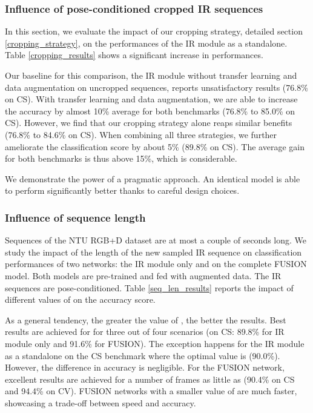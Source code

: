 \documentclass[letterpaper, 10 pt, conference]{ieeeconf}
\begin{document}
\subsubsection{Influence of pose-conditioned cropped IR sequences}

In this section, we evaluate the impact of our cropping strategy, detailed section \ref{cropping_strategy}, on the performances of the IR module as a standalone. Table \ref{cropping_results} shows a significant increase in performances. 

Our baseline for this comparison, the IR module without transfer learning and data augmentation on uncropped sequences, reports unsatisfactory results (76.8\% on CS). With transfer learning and data augmentation, we are able to increase the accuracy by almost 10\% average for both benchmarks (76.8\% to 85.0\% on CS). However, we find that our cropping strategy alone reaps similar benefits (76.8\% to 84.6\% on CS). When combining all three strategies, we further ameliorate the classification score by about 5\% (89.8\% on CS). The average gain for both benchmarks is thus above 15\%, which is considerable.

We demonstrate the power of a pragmatic approach. An identical model is able to perform significantly better thanks to careful design choices.

\subsubsection{Influence of sequence length}

Sequences of the NTU RGB+D dataset are at most a couple of seconds long. We study the impact of the length  of the new sampled IR sequence on classification performances of two networks: the IR module only and on the complete FUSION model. Both models are pre-trained and fed with augmented data. The IR sequences are pose-conditioned. Table \ref{seq_len_results} reports the impact of different values of  on the accuracy score. 

As a general tendency, the greater the value of , the better the results. Best results are achieved for  for three out of four scenarios (on CS: 89.8\% for IR module only and 91.6\% for FUSION). The exception happens for the IR module as a standalone on the CS benchmark where the optimal value is  (90.0\%). However, the difference in accuracy is negligible. For the FUSION network, excellent results are achieved for a number of frames as little as  (90.4\% on CS and 94.4\% on CV). FUSION networks with a smaller value of  are much faster, showcasing a trade-off between speed and accuracy. 
\end{document}
